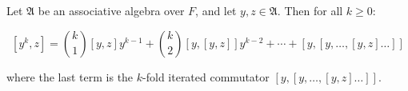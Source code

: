 Let $\mathfrak{A}$ be an associative algebra over $F$, and let $y, z \in \mathfrak{A}$. Then for all $k \geq 0$:

$$[y^k, z] = \binom{k}{1}[y, z]y^{k-1} + \binom{k}{2}[y, [y, z]]y^{k-2} + \cdots + [y, [y, \ldots, [y, z] \ldots]]$$

where the last term is the $k$-fold iterated commutator $[y, [y, \ldots, [y, z] \ldots]]$.
